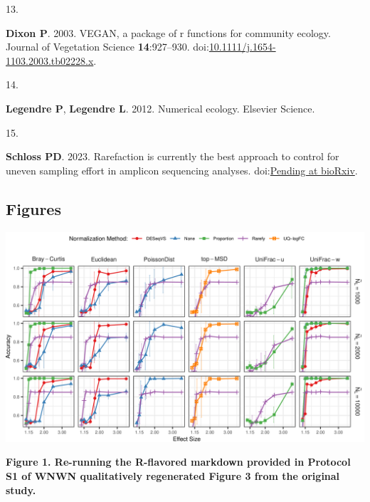 \documentclass[
]{article}
\newlength{\cslhangindent}
\newlength{\csllabelwidth}
\newlength{\cslentryspacingunit} %
\newenvironment{CSLReferences}[2] %
 {%
  \setlength{\parindent}{0pt}
  \ifodd #1
  \let\oldpar\par
  \def\par{\hangindent=\cslhangindent\oldpar}
  \fi
  \setlength{\parskip}{#2\cslentryspacingunit}
 }%
 {}
\newcommand{\CSLLeftMargin}[1]{\parbox[t]{\csllabelwidth}{#1}}
\newcommand{\CSLRightInline}[1]{\parbox[t]{\linewidth - \csllabelwidth}{#1}\break}
\begin{document}
\begin{CSLReferences}{0}{1}
\leavevmode{}%
\CSLLeftMargin{13. }%
\CSLRightInline{\textbf{Dixon P}. 2003. {VEGAN}, a package of r
functions for community ecology. Journal of Vegetation Science
\textbf{14}:927--930.
doi:\href{https://doi.org/10.1111/j.1654-1103.2003.tb02228.x}{10.1111/j.1654-1103.2003.tb02228.x}.}

\leavevmode{}%
\CSLLeftMargin{14. }%
\CSLRightInline{\textbf{Legendre P}, \textbf{Legendre L}. 2012.
Numerical ecology. Elsevier Science.}

\leavevmode{}%
\CSLLeftMargin{15. }%
\CSLRightInline{\textbf{Schloss PD}. 2023. Rarefaction is currently the
best approach to control for uneven sampling effort in amplicon
sequencing analyses.
doi:\href{https://doi.org/Pending\%20at\%20bioRxiv}{Pending at
bioRxiv}.}

\end{CSLReferences}

\appto{\bibsetup}{\raggedright}

\setlength{\parindent}{0in}
\setlength{\leftskip}{0in}

\newpage

\hypertarget{figures}{%
\subsection{Figures}\label{figures}}

\includegraphics{figure_01.png}

\textbf{Figure 1. Re-running the R-flavored markdown provided in
Protocol S1 of WNWN qualitatively regenerated Figure 3 from the original
study.}

\newpage
\end{document}
